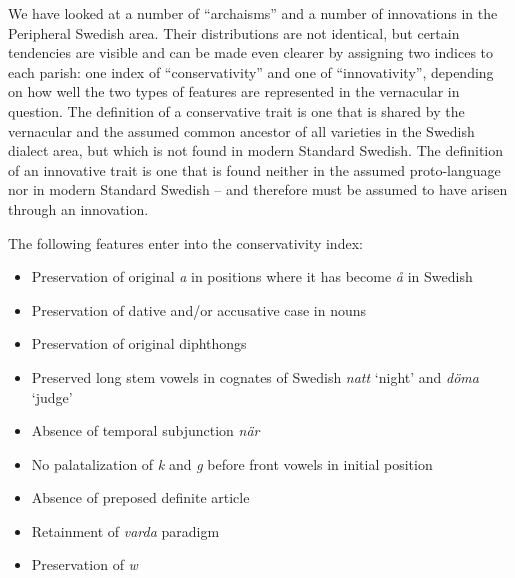 We have looked at a number of “archaisms” and a number of innovations in the Peripheral Swedish area. Their distributions are not identical, but certain tendencies are visible and can be made even clearer by assigning two indices to each parish: one index of “conservativity” and one of “innovativity”, depending on how well the two types of features are represented in the vernacular in question. The definition of a conservative trait is one that is shared by the vernacular and the assumed common ancestor of all varieties in the Swedish dialect area, but which is not found in modern Standard Swedish. The definition of an innovative trait is one that is found neither in the assumed proto-language nor in modern Standard Swedish – and therefore must be assumed to have arisen through an innovation. 

The following features enter into the conservativity index:

\begin{itemize}
\item 

Preservation of original \textit{a} in positions where it has become \textit{å} in Swedish

\item 

Preservation of dative and/or accusative case in nouns

\item 

Preservation of original diphthongs

\item 

Preserved long stem vowels in cognates of Swedish \textit{natt} ‘night’ and \textit{döma} ‘judge’

\item 

Absence of temporal subjunction \textit{när}

\item 

No palatalization of \textit{k} and \textit{g} before front vowels in initial position

\item 

Absence of preposed definite article

\item 

Retainment of \textit{varda} paradigm

\item 

Preservation of \textit{w}
\end{itemize}
 

